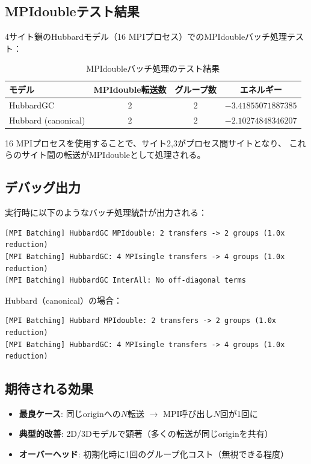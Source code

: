 \documentclass[11pt,a4paper]{article}
\begin{document}
\subsection{MPIdoubleテスト結果}

4サイト鎖のHubbardモデル（16 MPIプロセス）でのMPIdoubleバッチ処理テスト：

\begin{table}[h]
\centering
\begin{tabular}{lccc}
\toprule
モデル & MPIdouble転送数 & グループ数 & エネルギー \\
\midrule
HubbardGC & 2 & 2 & $-3.41855071887385$ \\
Hubbard (canonical) & 2 & 2 & $-2.10274848346207$ \\
\bottomrule
\end{tabular}
\caption{MPIdoubleバッチ処理のテスト結果}
\end{table}

16 MPIプロセスを使用することで、サイト2,3がプロセス間サイトとなり、
これらのサイト間の転送がMPIdoubleとして処理される。

\subsection{デバッグ出力}

実行時に以下のようなバッチ処理統計が出力される：
\begin{verbatim}
[MPI Batching] HubbardGC MPIdouble: 2 transfers -> 2 groups (1.0x reduction)
[MPI Batching] HubbardGC: 4 MPIsingle transfers -> 4 groups (1.0x reduction)
[MPI Batching] HubbardGC InterAll: No off-diagonal terms
\end{verbatim}

Hubbard（canonical）の場合：
\begin{verbatim}
[MPI Batching] Hubbard MPIdouble: 2 transfers -> 2 groups (1.0x reduction)
[MPI Batching] HubbardGC: 4 MPIsingle transfers -> 4 groups (1.0x reduction)
\end{verbatim}

\subsection{期待される効果}

\begin{itemize}
  \item \textbf{最良ケース}: 同じoriginへの$N$転送 $\rightarrow$ MPI呼び出し$N$回が1回に
  \item \textbf{典型的改善}: 2D/3Dモデルで顕著（多くの転送が同じoriginを共有）
  \item \textbf{オーバーヘッド}: 初期化時に1回のグループ化コスト（無視できる程度）
\end{itemize}
\end{document}
